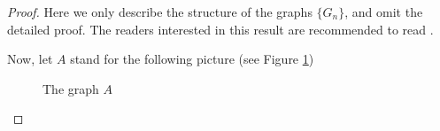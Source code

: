 \documentclass[12pt]{report}
\begin{document}
\begin{proof}
Here we only describe the structure of the graphs $\{G_n\}$, and omit the detailed proof. The readers interested in this result are recommended to read \cite{kaiser2007hamilton}.

Now, let $A$ stand for the following picture (see Figure \ref{picainv07})
\begin{figure}[h]
\begin{center}
\caption{The graph $A$}\label{picainv07}
\end{center}
\end{figure}


\end{proof}
\end{document}
